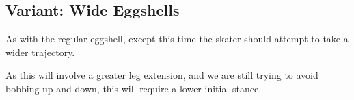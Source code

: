 \subsection*{Variant: Wide Eggshells}
\label{drill:sticky/eggshells/wide}

As with the regular eggshell, except this time the skater should attempt to take a wider trajectory.    

As this will involve a greater leg extension, and we are still trying to avoid bobbing up and down, this will require a lower initial stance.  

